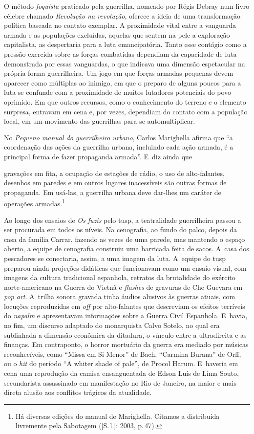 O método {\it foquista} praticado pela guerrilha, nomeado por Régis
Debray num livro célebre chamado {\it Revolução na revolução}, oferece a
ideia de uma transformação política baseada no contato exemplar. A
proximidade vital entre a vanguarda armada e as populações excluídas,
aquelas que sentem na pele a exploração capitalista, as despertaria para
a luta emancipatória. Tanto esse contágio como a pressão exercida sobre
as forças combatidas dependiam da capacidade de luta demonstrada por
essas vanguardas, o que indicava uma dimensão espetacular na própria
forma guerrilheira. Um jogo em que forças armadas pequenas devem
aparecer como múltiplas ao inimigo, em que o preparo de alguns poucos
para a luta se confunde com a proximidade de muitos lutadores potenciais
do povo oprimido. Em que outros recursos, como o conhecimento do terreno
e o elemento surpresa, entravam em cena e, por vezes, dependiam do contato
com a população local, em um movimento das guerrilhas para se
automultiplicar.

No {\it Pequeno manual do guerrilheiro urbano}, Carlos Marighella afirma
que “a coordenação das ações da guerrilha urbana, incluindo cada ação
armada, é a principal forma de fazer propaganda armada”. E~diz ainda que

\startblockquote
gravações em fita, a ocupação de estações de rádio, o uso de
alto-falantes, desenhos em paredes e em outros lugares inacessíveis são
outras formas de propaganda. Em usá-las, a guerrilha urbana deve
dar-lhes um caráter de operações armadas.\footnote{Há diversas edições
  do manual de Marighella. Citamos a distribuída livremente pela
  Sabotagem ({[}S.\,l.{]}: 2003, p.\,47).}
\stopblockquote

Ao longo dos ensaios de {\it Os fuzis} pelo {\sc tusp}, a teatralidade
guerrilheira passou a ser procurada em todos os níveis. Na cenografia,
ao fundo do palco, depois da casa da família Carrar, fazendo as vezes de
uma parede, mas mantendo o espaço aberto, a equipe de cenografia
construiu uma barricada feita de sacos. A~casa dos pescadores se
conectaria, assim, a uma imagem da luta. A~equipe do {\sc tusp} preparou ainda
projeções didáticas que funcionavam como um ensaio visual, com imagens
da cultura tradicional espanhola, retratos da brutalidade do exército
norte-americano na Guerra do Vietnã e {\it flashes} de gravuras de Che Guevara
em {\it pop art}. A~trilha sonora gravada tinha áudios alusivos às
guerras atuais, com locuções reproduzidas em {\it off} por alto-falantes
que descreviam os efeitos terríveis do {\it napalm} e apresentavam
informações sobre a Guerra Civil Espanhola. E~havia, no fim, um
discurso adaptado do monarquista Calvo Sotelo, no qual era sublinhada a
dimensão econômica da ditadura, o vínculo entre a ultradireita e as
finanças. Em contraponto, o horror mortuário da guerra era mediado por
músicas reconhecíveis, como “Missa em Si Menor” de Bach,
“Carmina Burana” de Orff, ou o {\it hit} do período “A whiter
shade of pale”, de Procol Harum. E~haveria em cena uma reprodução da
camisa ensanguentada de Edson Luís de Lima Souto, secundarista
assassinado em manifestação no Rio de Janeiro, na maior e mais direta
alusão aos conflitos trágicos da atualidade.

